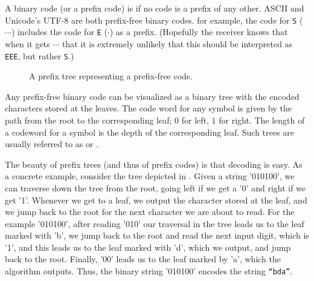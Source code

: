 A binary code (or a prefix code) is  if no code is
a prefix of any other.  ASCII and Unicode's U{}T{}F-$8$ are both
prefix-free binary codes.  for example, the code for
\texttt{S} ($\cdots$) includes the code for \texttt{E} ($\cdot$) as a
prefix. (Hopefully the receiver knows that when it gets $\cdots$ that
it is extremely unlikely that this should be interpreted as
\texttt{E{}E{}E}, but rather \texttt{S}.)

\begin{figure}[t]
    \centering
    \caption{A prefix tree representing a prefix-free code.}
\end{figure}

Any prefix-free binary code can be visualized as a binary tree with
the encoded characters stored at the leaves. The code word for any
symbol is given by the path from the root to the corresponding leaf;
$0$ for left, $1$ for right. The {length} of a codeword for a symbol
is the depth of the corresponding leaf. Such trees are usually
referred to as  or .



The beauty of prefix trees (and thus of prefix codes) is that decoding
is easy.  As a concrete example, consider the tree depicted in
. Given
a string '010100', we can traverse down the tree from the root, going
left if we get a '0' and right if we get '1'. Whenever we get to a leaf,
we output the character stored at the leaf, and we jump back to the
root for the next character we are about to read. For the example
'010100', after reading '010' our traversal in the tree leads us to
the leaf marked with 'b', we jump back to the root and read the next
input digit, which is '1', and this leads us to the leaf marked with
'd', which we output, and jump back to the root. Finally, '00' leads
us to the leaf marked by 'a', which the algorithm outputs. Thus, the
binary string '010100' encodes the string \texttt{``b{}d{}a''}.

